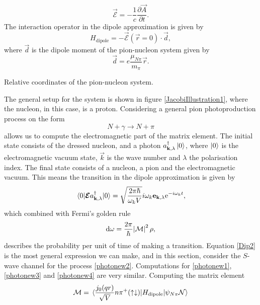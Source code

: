 \begin{equation}\label{EF}
	\vec{\mathcal{E}} = -\frac{1}{c} \frac{\partial \vec{A}}{\partial t}.
\end{equation}
The interaction operator in the dipole approximation is given by
\begin{equation}\label{Dip}
	H_\text{dipole} = -\vec{\mathcal{E}}(\vec{r}=0)\cdot \vec{d},
\end{equation}
where $\vec{d}$ is the dipole moment of the pion-nucleon system given by 
\begin{equation}\label{dipolemoment}
	\vec{d}=e\frac{\mu_{N\pi}}{m_\pi}\vec{r}.
\end{equation}
\begin{marginfigure}
	\centering
	
	\caption{Relative coordinates of the pion-nucleon system.}
	\label{JacobiIllustration1}
\end{marginfigure}
The general setup for the system is shown in figure \ref{JacobiIllustration1}, where the nucleon, in this case, is a proton. Considering a general pion photoproduction process on the form
\begin{equation}\label{General}
	N+\gamma \rightarrow N+\pi
\end{equation}
allows us to compute the electromagnetic part of the matrix element. The initial state consists of the dressed nucleon, and a photon $a_{\bm{\mathrm{k}},\lambda}^\dagger \ket{0}$, where $\ket{0}$ is the electromagnetic vacuum state, $\vec{k}$ is the wave number and $\lambda$ the polarisation index. The final state consists of a nucleon, a pion and the electromagnetic vacuum. This means the transition in the dipole approximation is given by 
\begin{equation}\label{Dip2}
	\mel{0}{\bm{\mathrm{\mathcal{E}}}a_{\bm{\mathrm{k}},\lambda}^\dagger}{0} = \sqrt{\frac{2\pi\hbar}{\omega_k V}}i\omega_k \bm{\mathrm{e}}_{\bm{\mathrm{k}},\lambda}\text{e}^{-i\omega_k t},
\end{equation}
which combined with Fermi's golden rule
\begin{equation}\label{FermiGoldenRule}
	\text{d}\omega = \frac{2\pi}{\hbar}\abs{\mathcal{M}}^2 \rho,
\end{equation}
describes the probability per unit of time of making a transition. Equation \eqref{Dip2} is the most general expression we can make, and in this section, consider the $S$-wave channel for the process \eqref{photonew2}. Computations for \eqref{photonew1}, \eqref{photonew3} and \eqref{photonew4} are very similar. Computing the matrix element
\begin{equation}\label{Hdip}
	\mathcal{M}=\mel*{\frac{j_0(qr)}{\sqrt{V}}n\pi^+(\uparrow\downarrow)}{H_\text{dipole}}{\psi_{N\pi}\mathcal{N}}
\end{equation}
